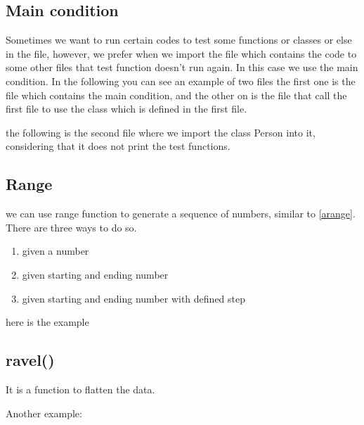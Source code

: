 \documentclass[10pt,a4paper]{article}
\begin{document}
\subsection{Main condition} \label{main}
Sometimes we want to run certain codes to test some functions or classes or else in the file, however, we prefer when we import the file which contains the code to some other files that test function doesn't run again. In this case we use the main condition. In the following you can see an example of two files the first one is the file which contains the main condition, and the other on is the file that call the first file to use the class which is defined in the first file.

the following is the second file where we import the class Person into it, considering that it does not print the test functions.



\subsection{Range} \label{range}
we can use range function to generate a sequence of numbers, similar to \ref{arange}. There are three ways to do so.
\begin{enumerate}
\item given a number
\item given starting and ending number
\item given starting and ending number with defined step
\end{enumerate}
here is the example

\subsection{ravel()}
It is a function to flatten the data.

Another example:

\end{document}
